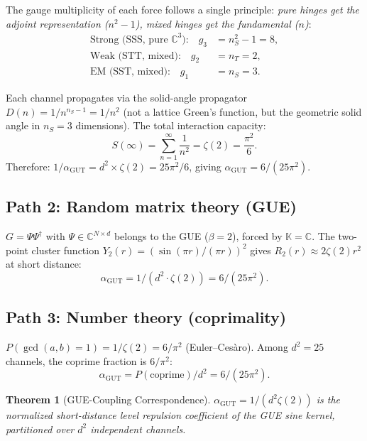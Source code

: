 \documentclass[12pt]{article}
\newtheorem{theorem}{Theorem}[section]
\theoremstyle{remark}
\begin{document}
{The gauge multiplicity of each force follows a single principle: \emph{pure hinges get the adjoint representation ($n^2-1$), mixed hinges get the fundamental ($n$)}:
\begin{align}
\text{Strong (SSS, pure } \mathbb{C}^3\text{):} \quad g_3 &= n_S^2 - 1 = 8, \\
\text{Weak (STT, mixed):} \quad g_2 &= n_T = 2, \\
\text{EM (SST, mixed):} \quad g_1 &= n_S = 3.
\end{align}

Each channel propagates via the solid-angle propagator $D(n) = 1/n^{n_S-1} = 1/n^2$ (not a lattice Green's function, but the geometric solid angle in $n_S = 3$ dimensions). The total interaction capacity:
\begin{equation}
S(\infty) = \sum_{n=1}^{\infty} \frac{1}{n^2} = \zeta(2) = \frac{\pi^2}{6}.
\end{equation}
Therefore: $1/\alpha_\text{GUT} = d^2 \times \zeta(2) = 25\pi^2/6$, giving $\alpha_\text{GUT} = 6/(25\pi^2)$.

\subsection{Path 2: Random matrix theory (GUE)}

$G = \Psi\Psi^\dagger$ with $\Psi \in \mathbb{C}^{N \times d}$ belongs to the GUE ($\beta = 2$), forced by $\mathbb{K} = \mathbb{C}$. The two-point cluster function $Y_2(r) = (\sin(\pi r)/(\pi r))^2$ gives $R_2(r) \approx 2\zeta(2)r^2$ at short distance:
\begin{equation}
\alpha_\text{GUT} = 1/(d^2 \cdot \zeta(2)) = 6/(25\pi^2).
\end{equation}

\subsection{Path 3: Number theory (coprimality)}

$P(\gcd(a,b) = 1) = 1/\zeta(2) = 6/\pi^2$ (Euler--Ces\`aro). Among $d^2 = 25$ channels, the coprime fraction is $6/\pi^2$:
\begin{equation}
\alpha_\text{GUT} = P(\text{coprime})/d^2 = 6/(25\pi^2).
\end{equation}

\begin{theorem}[GUE-Coupling Correspondence]
$\alpha_\text{GUT} = 1/(d^2\zeta(2))$ is the normalized short-distance level repulsion coefficient of the GUE sine kernel, partitioned over $d^2$ independent channels.
\end{theorem}

}
\end{document}
